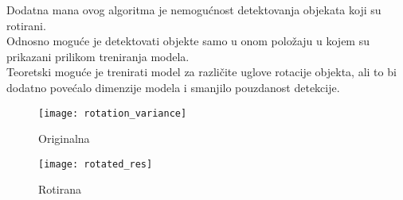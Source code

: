 Dodatna mana ovog algoritma je nemogućnost detektovanja objekata koji su
rotirani. \\
Odnosno moguće je detektovati objekte samo u onom položaju u kojem su prikazani
prilikom treniranja modela. \\
Teoretski moguće je trenirati model za različite uglove rotacije objekta, ali to
bi dodatno povećalo dimenzije modela i smanjilo pouzdanost detekcije. \\

\begin{figure}[H]
  \centering
  \parbox{0.4\linewidth}{
    \texttt{[image: rotation\_variance]}
    \caption{Originalna\cite{CALTECH_DATASET}}
    \label{rotation_variance}}
  \qquad
  \begin{minipage}{0.4\linewidth}
    \texttt{[image: rotated\_res]}
    \caption{Rotirana\cite{CALTECH_DATASET}}
    \label{rotated_res}
  \end{minipage}
\end{figure}